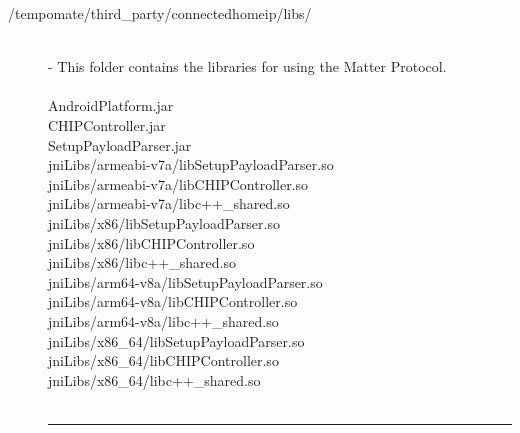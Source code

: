 \begin{enumerate}[label=\alph*]
\begin{description}
    \item[/tempomate/third\_party/connectedhomeip/libs/] \hfill \\
    \small
    - This folder contains the libraries for using the Matter Protocol.\\\\
    \footnotesize
        AndroidPlatform.jar  \\
        CHIPController.jar  \\
        SetupPayloadParser.jar  \\
        jniLibs/armeabi-v7a/libSetupPayloadParser.so  \\
        jniLibs/armeabi-v7a/libCHIPController.so  \\
        jniLibs/armeabi-v7a/libc++\_shared.so  \\
        jniLibs/x86/libSetupPayloadParser.so  \\
        jniLibs/x86/libCHIPController.so  \\
        jniLibs/x86/libc++\_shared.so  \\
        jniLibs/arm64-v8a/libSetupPayloadParser.so  \\
        jniLibs/arm64-v8a/libCHIPController.so  \\
        jniLibs/arm64-v8a/libc++\_shared.so  \\
        jniLibs/x86\_64/libSetupPayloadParser.so  \\
        jniLibs/x86\_64/libCHIPController.so  \\
        jniLibs/x86\_64/libc++\_shared.so  \\\\

            \vspace{-0.2cm}
      \hrule
      \vspace{0.2cm}
      

\end{description}
\end{enumerate}

